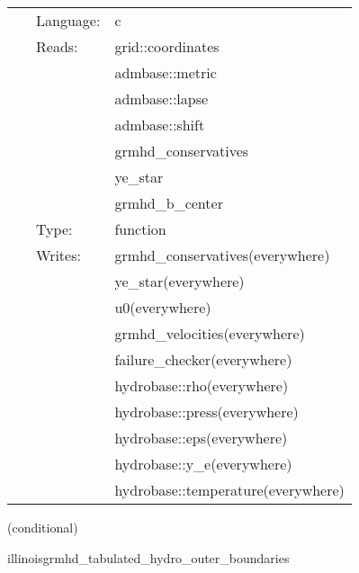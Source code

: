 \hspace{5mm}{\it tabulated version of illinoisgrmhd\_conservs\_to\_prims } 


\hspace{5mm}

 \begin{tabular*}{160mm}{cll} 
~ & Language:  & c \\ 
~ & Reads:  & grid::coordinates \\ 
~& ~ &admbase::metric\\ 
~& ~ &admbase::lapse\\ 
~& ~ &admbase::shift\\ 
~& ~ &grmhd\_conservatives\\ 
~& ~ &ye\_star\\ 
~& ~ &grmhd\_b\_center\\ 
~ & Type:  & function \\ 
~ & Writes:  & grmhd\_conservatives(everywhere) \\ 
~& ~ &ye\_star(everywhere)\\ 
~& ~ &u0(everywhere)\\ 
~& ~ &grmhd\_velocities(everywhere)\\ 
~& ~ &failure\_checker(everywhere)\\ 
~& ~ &hydrobase::rho(everywhere)\\ 
~& ~ &hydrobase::press(everywhere)\\ 
~& ~ &hydrobase::eps(everywhere)\\ 
~& ~ &hydrobase::y\_e(everywhere)\\ 
~& ~ &hydrobase::temperature(everywhere)\\ 
\end{tabular*} 


\vspace{5mm}

   (conditional) 

\hspace{5mm} illinoisgrmhd\_tabulated\_hydro\_outer\_boundaries 

\hspace{5mm}{\it tabulated version of illinoisgrmhd\_outer\_boundaries } 


\hspace{5mm}

